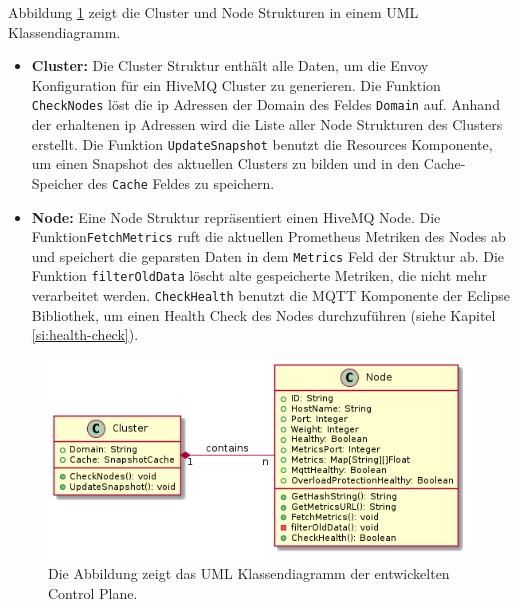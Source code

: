 Abbildung \ref{fig:class-diagram} zeigt die Cluster und Node Strukturen in einem UML Klassendiagramm.
\begin{itemize}
  \item \textbf{Cluster:} Die Cluster Struktur enthält alle Daten, um die Envoy Konfiguration für ein HiveMQ Cluster zu generieren. Die Funktion \verb|CheckNodes| löst die \ac{ip} Adressen der Domain des Feldes \verb|Domain| auf. Anhand der erhaltenen \ac{ip} Adressen wird die Liste aller Node Strukturen des Clusters erstellt. Die Funktion \verb|UpdateSnapshot| benutzt die Resources Komponente, um einen Snapshot des aktuellen Clusters zu bilden und in den Cache-Speicher des \verb|Cache| Feldes zu speichern.
  \item \textbf{Node:} Eine Node Struktur repräsentiert einen HiveMQ Node. Die Funktion\newline \verb|FetchMetrics| ruft die aktuellen Prometheus Metriken des Nodes ab und speichert die geparsten Daten in dem \verb|Metrics| Feld der Struktur ab. Die Funktion \verb|filterOldData| löscht alte gespeicherte Metriken, die nicht mehr verarbeitet werden. \verb|CheckHealth| benutzt die MQTT Komponente der Eclipse Bibliothek, um einen Health Check des Nodes durchzuführen (siehe Kapitel \ref{si:health-check}).
\end{itemize}

\begin{figure}
    \centering
    \includegraphics[scale=0.6]{gen/class.png}
    \caption{Die Abbildung zeigt das UML Klassendiagramm der entwickelten Control Plane.}
    \label{fig:class-diagram}
\end{figure}

